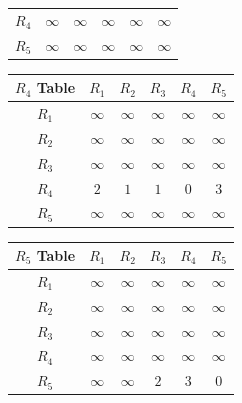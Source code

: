 \documentclass[en]{university}
\begin{document}
\begin{minipage}[t]{0.5\textwidth}
\begin{table}[H]
\begin{tabular}{c|*5c}
            $R_4$       & $\infty$ & $\infty$ & $\infty$ & $\infty$ & $\infty$ \\
            $R_5$       & $\infty$ & $\infty$ & $\infty$ & $\infty$ & $\infty$
        \end{tabular}
        \begin{tabular}{c|*5c}
            $R_4$ Table & $R_1$    & $R_2$    & $R_3$    & $R_4$    & $R_5$    \\
            \hline
            $R_1$       & $\infty$ & $\infty$ & $\infty$ & $\infty$ & $\infty$ \\
            $R_2$       & $\infty$ & $\infty$ & $\infty$ & $\infty$ & $\infty$ \\
            $R_3$       & $\infty$ & $\infty$ & $\infty$ & $\infty$ & $\infty$ \\
            $R_4$       & $2$      & $1$      & $1$      & $0$      & $3$      \\
            $R_5$       & $\infty$ & $\infty$ & $\infty$ & $\infty$ & $\infty$
        \end{tabular}
        \begin{tabular}{c|*5c}
            $R_5$ Table & $R_1$    & $R_2$    & $R_3$    & $R_4$    & $R_5$    \\
            \hline
            $R_1$       & $\infty$ & $\infty$ & $\infty$ & $\infty$ & $\infty$ \\
            $R_2$       & $\infty$ & $\infty$ & $\infty$ & $\infty$ & $\infty$ \\
            $R_3$       & $\infty$ & $\infty$ & $\infty$ & $\infty$ & $\infty$ \\
            $R_4$       & $\infty$ & $\infty$ & $\infty$ & $\infty$ & $\infty$ \\
            $R_5$       & $\infty$ & $\infty$ & $2$      & $3$      & $0$
        \end{tabular}
    \end{table}
\end{minipage}
\end{document}

